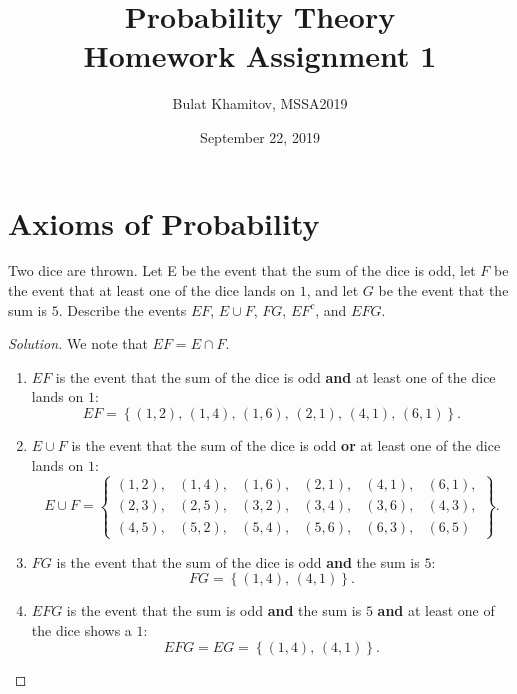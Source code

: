 \documentclass{article}[12pt]
\title{Probability Theory \\ Homework Assignment 1}
\author{Bulat Khamitov, MSSA2019}
\date{September 22, 2019}
\newenvironment{solution}
  {\renewcommand\qedsymbol{$\blacksquare$}\begin{proof}[Solution]}
  {\end{proof}}
\newenvironment{problem}[1]
  {\renewcommand\theinnercustomprblm{#1}\innercustomprblm}
  {\endinnercustomprblm}
\begin{document}
\maketitle

\section{Axioms of Probability}

\begin{problem}{3}\normalfont
Two dice are thrown. 
Let E be the event that the sum of the dice is odd, let $F$ be the event that at least one of the dice lands on $1$, and let $G$ be the event that the sum is $5$. 
Describe the events $EF$, $E\cup F$, $FG$, $EF^{c}$, and $EFG$.
\end{problem}

\begin{solution}
We note that $EF = E \cap F$.
\begin{enumerate}
    \item $EF$ is the event that the sum of the dice is odd \textbf{and} at least one of the dice lands on $1$:
    \begin{equation*}
        EF = \left\{(1, 2),\, (1, 4),\, (1, 6),\, (2, 1),\, (4, 1),\, (6, 1)\right\}.
    \end{equation*}
    
    \item $E\cup F$ is the event that the sum of the dice is odd \textbf{or} at least one of the dice lands on $1$:
    \begin{equation*}
        E\cup F =
        \begin{Bmatrix}
        (1, 2), & (1, 4), & (1, 6), & (2, 1), & (4, 1), & (6, 1),
        \\
        (2, 3), & (2, 5), & (3, 2), & (3, 4), & (3, 6), & (4, 3),
        \\
        (4, 5), & (5, 2), & (5, 4), & (5, 6), & (6, 3), & (6, 5)
        \end{Bmatrix}.
    \end{equation*}
    
    \item $FG$ is the event that the sum of the dice is odd \textbf{and} the sum is $5$:
    \begin{equation*}
        FG = \left\{(1, 4),\, (4, 1)\right\}.
    \end{equation*}
    
    \item $EFG$ is the event that the sum is odd \textbf{and} the sum is $5$ \textbf{and} at least one of the dice shows a $1$:
    \begin{equation*}
        EFG = EG = \left\{(1, 4),\, (4, 1)\right\}.
    \end{equation*}
    

\end{enumerate}
\end{solution}
\end{document}
